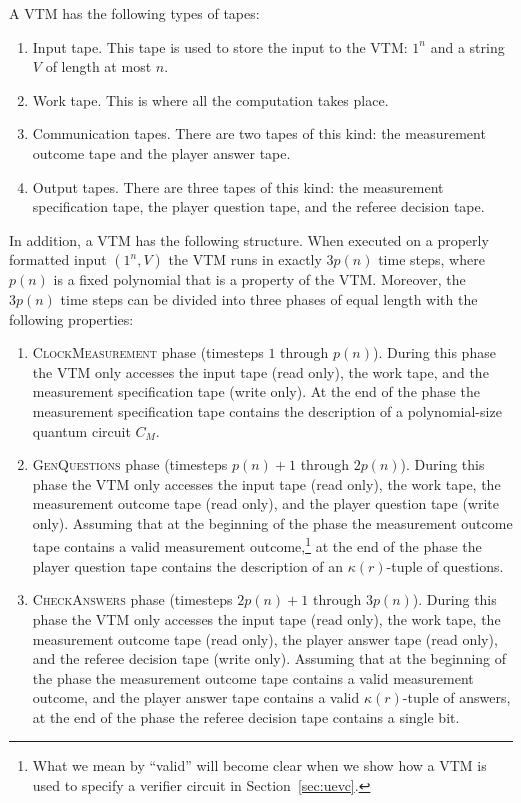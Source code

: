 \documentclass[11pt,letterpaper]{article}
\begin{document}
A VTM has the following types of tapes:
\begin{enumerate}
	\item Input tape. This tape is used to store the input to the VTM: $1^n$ and a string $V$ of length at most $n$. 
	\item Work tape. This is where all the computation takes place.
	\item Communication tapes. There are two tapes of this kind: the measurement outcome tape and the player answer tape. 
	\item Output tapes. There are three tapes of this kind: the measurement specification tape, the player question tape, and the referee decision tape. 
\end{enumerate}
In addition, a VTM has the following structure. When executed on a properly formatted input $(1^n,V)$ the VTM runs in exactly $3p(n)$ time steps, where $p(n)$ is a fixed polynomial that is a property of the VTM. Moreover, the $3p(n)$ time steps can be divided into three phases of equal length with the following properties: 
\begin{enumerate}
\item \textsc{ClockMeasurement} phase (timesteps $1$ through $p(n)$). During this phase the VTM only accesses the input tape (read only), the work tape, and the measurement specification tape (write only). At the end of the phase the measurement specification tape contains the description of a polynomial-size quantum circuit $C_M$.  
\item  \textsc{GenQuestions} phase (timesteps $p(n) +1$ through $2p(n)$). During this phase the VTM only accesses the input tape (read only), the work tape, the measurement outcome tape (read only), and the player question tape (write only). Assuming that at the beginning of the phase the measurement outcome tape contains a valid measurement outcome,\footnote{What we mean by ``valid'' will become clear when we show how a VTM is used to specify a verifier circuit in Section~\ref{sec:uevc}.} at the end of the phase the player question tape contains the description of an $\kappa(r)$-tuple of questions. 
\item \textsc{CheckAnswers} phase (timesteps $2p(n) + 1$ through $3p(n)$). During this phase the VTM only accesses the input tape (read only), the work tape, the measurement outcome tape (read only), the player answer tape (read only), and the referee decision tape (write only). Assuming that at the beginning of the phase the measurement outcome tape contains a valid measurement outcome, and the player answer tape contains a valid $\kappa(r)$-tuple of answers, at the end of the phase the referee decision tape contains a single bit. 
\end{enumerate}
\end{document}
